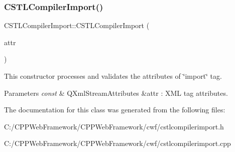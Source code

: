 \subsubsection{\texorpdfstring{C\+S\+T\+L\+Compiler\+Import()}{CSTLCompilerImport()}}
{\footnotesize\ttfamily C\+S\+T\+L\+Compiler\+Import\+::\+C\+S\+T\+L\+Compiler\+Import (\begin{DoxyParamCaption}\item[{const Q\+Xml\+Stream\+Attributes \&}]{attr }\end{DoxyParamCaption})\hspace{0.3cm}{\ttfamily [explicit]}}



This constructor processes and validates the attributes of \char`\"{}import\char`\"{} tag. 


\begin{DoxyParams}{Parameters}
{\em const} & Q\+Xml\+Stream\+Attributes \&attr \+: X\+ML tag attributes. \\
\hline
\end{DoxyParams}


The documentation for this class was generated from the following files\+:\begin{DoxyCompactItemize}
\item 
C\+:/\+C\+P\+P\+Web\+Framework/\+C\+P\+P\+Web\+Framework/cwf/cstlcompilerimport.\+h\item 
C\+:/\+C\+P\+P\+Web\+Framework/\+C\+P\+P\+Web\+Framework/cwf/cstlcompilerimport.\+cpp\end{DoxyCompactItemize}
